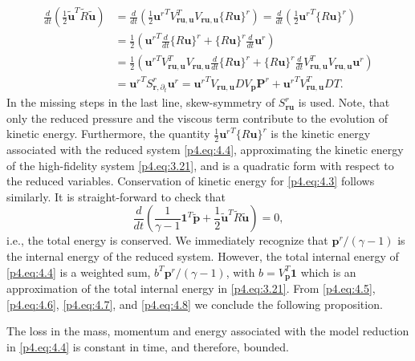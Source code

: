 \begin{equation} \label{p4.eq:4.7}
	\begin{aligned}
	\frac{d}{dt}\left( \frac 1 2 \tilde{\mathbf u}^T \tilde{ R } \tilde {\mathbf u} \right) &= \frac{d}{dt}\left( \frac 1 2 {\mathbf u^r}^T V_{\mathbf r \mathbf u , \mathbf u}^T V_{\mathbf r \mathbf u , \mathbf u} \{ R \mathbf u\}^r \right) = \frac{d}{dt}\left( \frac 1 2 {\mathbf u^r}^T \{ R \mathbf u\}^r \right) \\
	&= \frac 1 2 \left( {\mathbf u^r}^T \frac{d}{dt} \{ R \mathbf u \}^r + \{ R \mathbf u \}^r \frac{d}{dt} \mathbf u^r \right) \\
	&= \frac 1 2 \left( {\mathbf u^r}^T V_{\mathbf r \mathbf u , \mathbf u}^T V_{\mathbf r \mathbf u , \mathbf u} \frac{d}{dt} \{ R \mathbf u \}^r + \{ R \mathbf u \}^r \frac{d}{dt} V_{\mathbf r \mathbf u , \mathbf u}^T V_{\mathbf r \mathbf u , \mathbf u} \mathbf u^r \right) \\
	&= {\mathbf u^r}^T S^r_{\mathbf r, \partial_t} \mathbf u^r = { \mathbf u^r }^T V_{\mathbf r \mathbf u , \mathbf u} D V_{\mathbf p} \mathbf P^r + { \mathbf u^r }^T V_{\mathbf r \mathbf u , \mathbf u}^T D T.
	\end{aligned}
\end{equation}
In the missing steps in the last line, skew-symmetry of $S_{\mathbf r \mathbf u}^r$ is used. Note, that only the reduced pressure and the viscous term contribute to the evolution of kinetic energy. Furthermore, the quantity $ \frac 1 2 {\mathbf u^r}^T \{ R \mathbf u\}^r$ is the kinetic energy associated with the reduced system \eqref{p4.eq:4.4}, approximating the kinetic energy of the high-fidelity system \eqref{p4.eq:3.21}, and is a quadratic form with respect to the reduced variables. Conservation of kinetic energy for \eqref{p4.eq:4.3} follows similarly. It is  straight-forward to check that
\begin{equation} \label{p4.eq:4.8}
	\frac{d}{dt} \left( \frac{1}{\gamma - 1} \mathbf 1^T \tilde{\mathbf p} + \frac{1}{2} \tilde{\mathbf u}^T \tilde R \tilde{\mathbf u} \right) = 0,
\end{equation}
i.e., the total energy is conserved. We immediately recognize that $ \mathbf p^r /(\gamma - 1)$ is the internal energy of the reduced system. However, the total internal energy of \eqref{p4.eq:4.4} is a weighted sum, $ b^T\mathbf p^r /(\gamma - 1)$, with $b = V_{\mathbf p}^T \mathbf 1$ which is an approximation of the total internal energy in \eqref{p4.eq:3.21}. From \eqref{p4.eq:4.5}, \eqref{p4.eq:4.6}, \eqref{p4.eq:4.7}, and \eqref{p4.eq:4.8} we conclude the following proposition.
\begin{proposition}
	The loss in the mass, momentum and energy associated with the model reduction in \eqref{p4.eq:4.4} is constant in time, and therefore, bounded.
\end{proposition}

